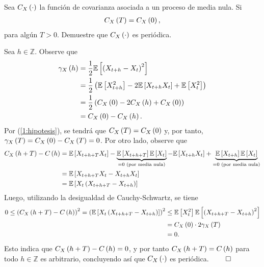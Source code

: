 \documentclass[../main.tex]{subfiles}
\begin{document}
    \begin{enunciado}
    	Sea $C_X\left( \cdot \right)$ la función de covarianza asociada a un proceso de media nula. Si
            \begin{align}
                \label{1:hipotesis}
            	C_X\left( T \right) = C_X\left( 0 \right),
            \end{align}
        para algún $T > 0$. Demuestre que $C_X\left( \cdot \right)$ es periódica.
    \end{enunciado}

    \begin{demostracion}
        Sea $h \in \mathbb{Z}$. Observe que
            \begin{align*}
            	\gamma_X\left( h \right) &= \frac 1 2 \mathbb{E} \left[ \left( X_{t+h} - X_t \right)^2 \right]\\
            	&= \frac 1 2 \left( \mathbb{E} \left[ X_{t+h}^2 \right] - 2 \mathbb{E} \left[ X_{t+h}X_t \right] + \mathbb{E} \left[ X_t^2 \right] \right)\\
            	&= \frac 1 2 \left( C_X\left( 0 \right) - 2 C_X\left( h \right) + C_X\left( 0 \right) \right)\\
            	&= C_X\left( 0 \right) - C_X\left( h \right).
            \end{align*}
        Por (\ref{1:hipotesis}), se tendrá que $C_X\left( T \right) = C_X\left( 0 \right)$ y, por tanto, $\gamma_X\left( T \right) = C_X\left( 0 \right) - C_X\left( T \right) = 0$.
        Por otro lado, observe que
            \begin{align*}
            	C_X\left( h+T \right) - C\left( h \right) &= \mathbb{E} \left[ X_{t+h+T}X_t \right] - \underbrace{\mathbb{E} \left[ X_{t+h+T} \right]\mathbb{E} \left[ X_t \right]}_{ = 0 \text{ (por media nula)}} - \mathbb{E} \left[ X_{t+h}X_t \right] + \underbrace{\mathbb{E} \left[ X_{t+h} \right]\mathbb{E} \left[ X_t \right]}_{{ = 0 \text{ (por media nula)}}}\\
                &= \mathbb{E} \left[ X_{t+h+T}X_t - X_{t+h}X_t \right]\\
                &= \mathbb{E} \left[ X_t \left( X_{t+h+T} - X_{t+h} \right) \right]
            \end{align*}
        Luego, utilizando la desigualdad de Cauchy-Schwartz, se tiene
            \begin{align*}
            	0 \leq \left( C_X\left( h+T \right) - C\left( h \right) \right)^2 = \left( \mathbb{E} \left[ X_t \left( X_{t+h+T} - X_{t+h} \right) \right] \right)^2 &\leq \mathbb{E} \left[ X^2_t \right] \mathbb{E} \left[ \left( X_{t+h+T} - X_{t+h} \right)^2 \right]\\
            	&= C_X\left( 0 \right) \cdot 2 \gamma_X\left( T \right)\\
            	&= 0.
            \end{align*}
        Esto indica que $C_X\left( h+T \right) - C\left( h \right) = 0$, y por tanto $C_X\left( h+T \right) = C\left( h \right)$ para todo $h \in \mathbb Z$ es arbitrario, concluyendo así que $C_X\left( \cdot \right)$ es periódica. $\qed$
    \end{demostracion}
\end{document}

